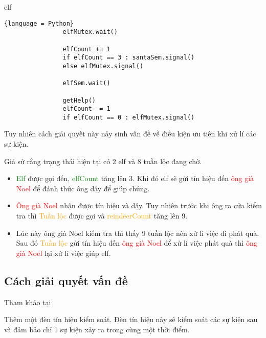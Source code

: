 \documentclass[a4paper]{article}
\begin{document}
    \begin{center}
        elf
        \begin{tcolorbox}
            \begin{lstlisting}{language = Python}
                elfMutex.wait()

                elfCount += 1
                if elfCount == 3 : santaSem.signal()
                else elfMutex.signal()
                
                elfSem.wait()
                
                getHelp()
                elfCount -= 1
                if elfCount == 0 : elfMutex.signal()
            \end{lstlisting}
        
        \end{tcolorbox}
    \end{center}
    
    Tuy nhiên cách giải quyết này nảy sinh vấn đề về điều kiện ưu tiên khi xử lí các sự kiện.
    
    Giả sử rằng trạng thái hiện tại có 2 elf và 8 tuần lộc đang chờ.
    \begin{itemize}
        \item \textcolor{green}{Elf} được gọi đến, \textcolor{green}{elfCount} tăng lên 3. Khi đó elf sẽ gửi tín hiệu đến \textcolor{red}{ông già Noel} để đánh thức ông dậy để giúp chúng.
        \item \textcolor{red}{Ông già Noel} nhận được tín hiệu và dậy. Tuy nhiên trước khi ông ra cửa kiểm tra thì \textcolor{orange}{Tuần lộc} được gọi và \textcolor{orange}{reindeerCount} tăng lên 9.
        \item Lúc này ông già Noel kiểm tra thì thấy 9 tuần lộc nên xử lí việc đi phát quà. Sau đó \textcolor{orange}{Tuần lộc} gửi tín hiệu đến \textcolor{red}{ông già Noel} để xử lí việc phát quà thì \textcolor{red}{ông già Noel} lại xử lí việc giúp elf.
    \end{itemize}
            

    
    \subsection{Cách giải quyết vấn đề}
    Tham khảo tại \cite{littlebook4} \cite{youtube1}
    
    Thêm một đèn tín hiệu kiểm soát. Đèn tín hiệu này sẽ kiểm soát các sự kiện sau và đảm bảo chỉ 1 sự kiện xảy ra trong cùng một thời điểm.
   
\end{document}
